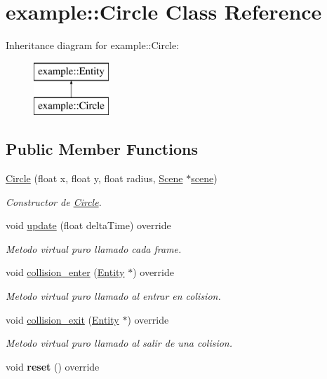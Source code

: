 \hypertarget{classexample_1_1_circle}{}\section{example\+::Circle Class Reference}
\label{classexample_1_1_circle}
Inheritance diagram for example\+::Circle\+:\begin{figure}[H]
\begin{center}
\leavevmode
\includegraphics[height=2.000000cm]{classexample_1_1_circle}
\end{center}
\end{figure}
\subsection*{Public Member Functions}
\begin{DoxyCompactItemize}
\item 
\mbox{\hyperlink{classexample_1_1_circle_a1503756ba54426530f6aaa51925c2cac}{Circle}} (float x, float y, float radius, \mbox{\hyperlink{classexample_1_1_scene}{Scene}} $\ast$\mbox{\hyperlink{classexample_1_1_entity_ab851dbde4a16829f9fb77ab9a66b9f1e}{scene}})
\begin{DoxyCompactList}\small\item\em Constructor de \mbox{\hyperlink{classexample_1_1_circle}{Circle}}. \end{DoxyCompactList}\item 
void \mbox{\hyperlink{classexample_1_1_circle_a49dfe984ad6e169dae2a651d79951475}{update}} (float delta\+Time) override
\begin{DoxyCompactList}\small\item\em Metodo virtual puro llamado cada frame. \end{DoxyCompactList}\item 
void \mbox{\hyperlink{classexample_1_1_circle_a098e101e7fe49694bf9f26749d48e62e}{collision\+\_\+enter}} (\mbox{\hyperlink{classexample_1_1_entity}{Entity}} $\ast$) override
\begin{DoxyCompactList}\small\item\em Metodo virtual puro llamado al entrar en colision. \end{DoxyCompactList}\item 
void \mbox{\hyperlink{classexample_1_1_circle_ab8570fcf0357a37d6f9f354c0d02c725}{collision\+\_\+exit}} (\mbox{\hyperlink{classexample_1_1_entity}{Entity}} $\ast$) override
\begin{DoxyCompactList}\small\item\em Metodo virtual puro llamado al salir de una colision. \end{DoxyCompactList}\item 
\mbox{\label{classexample_1_1_circle_a6f6912aba7e64f5a38fb8a246fe91bba}} 
void {\bfseries reset} () override
\end{DoxyCompactItemize}
